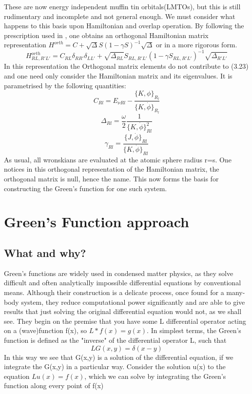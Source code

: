 \documentclass[12pt]{article}
\begin{document}
These are now energy independent muffin tin orbitals(LMTOs), but this is still rudimentary and incomplete and not general enough. We must consider what happens to this basis upon Hamiltonian and overlap operation. By following the prescription used in \cite{turek}, one obtains an orthogonal Hamiltonian matrix representation $H^{orth}=C + \sqrt{\Delta}S(1-\gamma S)^{-1} \sqrt{\Delta}$ or in a more rigorous form\cite{drchal}.
\begin{equation} \label{3.20} \tag{3.30}
H^{orth}_{RL,R'L'}=C_{RL}\delta_{RR'}\delta_{LL'} + \sqrt{\Delta_{RL}}S_{RL,R'L'}(1-\gamma S_{RL,R'L'})^{-1} \sqrt{\Delta_{R'L'}}
\end{equation}
In this representation the Orthogonal matrix elements do not contribute to (3.23) and one need only consider the Hamiltonian matrix and its eigenvalues. It is parametrised by the following quantities: 
$$C_{Rl}=E_{\nu Rl}-\frac{\{K,\phi\}_R_l}{\{K,\dot{\phi}\}_R_l}$$
$$\Delta_{Rl}=\frac{\omega}{2} \frac{1}{\{K,\dot{\phi}\}^2_{Rl}}$$
$$\gamma_{Rl}=\frac{\{J,\dot{\phi}\}_{Rl}}{\{K,\dot{\phi}\}_{Rl}}$$
As usual, all wronskians are evaluated at the atomic sphere radius r=s. One notices in this orthogonal representation of the Hamiltonian matrix, the orthogonal matrix is null, hence the name. This now forms the basis for constructing the Green's function for one such system. 

\section{Green's Function approach}
\subsection{What and why?}

Green's functions are widely used in condensed matter physics, as they solve difficult and often analytically impossible differential equations by conventional means. Although their construction is a delicate process, once found for a many-body system, they reduce computational power significantly and are able to give results that just solving the original differential equation would not, as we shall see. They begin on the premise that you have some L differential operator acting on a (wave)function f(x), so $L*f(x)=g(x)$. In simplest terms, the Green's function is defined as the "inverse" of the differential operator L, such that 
$$LG(x,y)=\delta (x-y)$$
In this way we see that G(x,y) is a solution of the differential equation, if we integrate the G(x,y) in a particular way. Consider the solution u(x) to the equation $Lu(x)=f(x)$, which we can solve by integrating the Green's function along every point of f(x)
\end{document}
